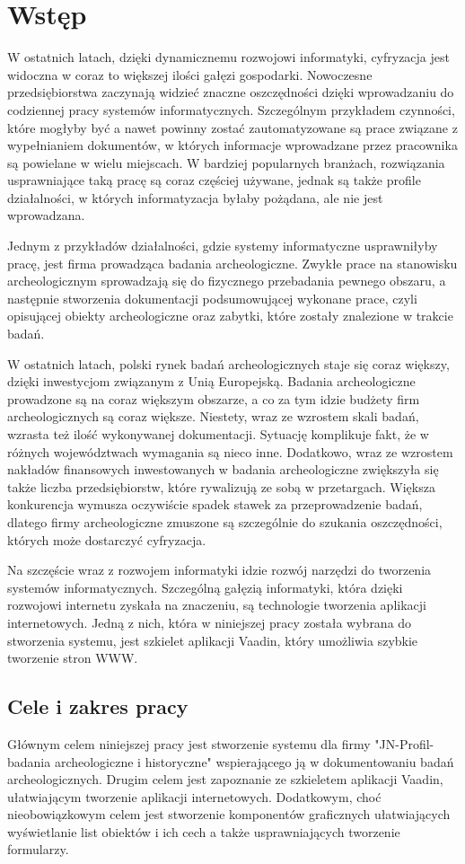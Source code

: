 \chapter{Wstęp}
W ostatnich latach, dzięki dynamicznemu rozwojowi informatyki, cyfryzacja jest widoczna w coraz to większej ilości gałęzi gospodarki. Nowoczesne przedsiębiorstwa zaczynają widzieć znaczne oszczędności dzięki wprowadzaniu do codziennej pracy systemów informatycznych. Szczególnym przykładem czynności, które mogłyby być a nawet powinny zostać zautomatyzowane są prace związane z wypełnianiem dokumentów, w których informacje wprowadzane przez pracownika są powielane w wielu miejscach. W bardziej popularnych branżach, rozwiązania usprawniające taką pracę są coraz częściej używane, jednak są także profile działalności, w których informatyzacja byłaby pożądana, ale nie jest wprowadzana.

Jednym z przykładów działalności, gdzie systemy informatyczne usprawniłyby pracę, jest firma prowadząca badania archeologiczne. Zwykłe prace na stanowisku archeologicznym sprowadzają się do fizycznego przebadania pewnego obszaru, a następnie stworzenia dokumentacji podsumowującej wykonane prace, czyli opisującej obiekty archeologiczne oraz zabytki, które zostały znalezione w trakcie badań.

W ostatnich latach, polski rynek badań archeologicznych staje się coraz większy, dzięki inwestycjom związanym z Unią Europejską. Badania archeologiczne prowadzone są na coraz większym obszarze, a co za tym idzie budżety firm archeologicznych są coraz większe. Niestety, wraz ze wzrostem skali badań, wzrasta też ilość wykonywanej dokumentacji. Sytuację komplikuje fakt, że w różnych województwach wymagania są nieco inne. Dodatkowo, wraz ze wzrostem nakładów finansowych inwestowanych w badania archeologiczne zwiększyła się także liczba przedsiębiorstw, które rywalizują ze sobą w przetargach. Większa konkurencja wymusza oczywiście spadek stawek za przeprowadzenie badań, dlatego firmy archeologiczne zmuszone są szczególnie do szukania oszczędności, których może dostarczyć cyfryzacja.

Na szczęście wraz z rozwojem informatyki idzie rozwój narzędzi do tworzenia systemów informatycznych. Szczególną gałęzią informatyki, która dzięki rozwojowi internetu zyskała na znaczeniu, są technologie tworzenia aplikacji internetowych. Jedną z nich, która w niniejszej pracy została wybrana do stworzenia systemu, jest szkielet aplikacji Vaadin, który umożliwia szybkie tworzenie stron WWW. 
\newpage
\section{Cele i zakres pracy}
Głównym celem niniejszej pracy jest stworzenie systemu dla firmy "JN-Profil- badania archeologiczne i historyczne"  wspierającego ją w dokumentowaniu badań archeologicznych. Drugim celem jest zapoznanie ze szkieletem aplikacji Vaadin, ułatwiającym tworzenie aplikacji internetowych. Dodatkowym, choć nieobowiązkowym celem jest stworzenie komponentów graficznych ułatwiających wyświetlanie list obiektów i ich cech a także usprawniających tworzenie formularzy. 

